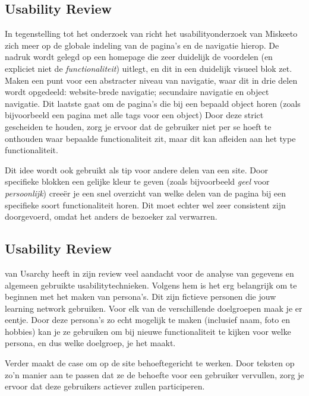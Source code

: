 \documentclass[a4paper, 10pt, pdftex]{report}
\begin{document}
    \subsection{Usability Review \citet{Hoekman2008}}
    In tegenstelling tot het onderzoek van \citeauthor{Alfrink2008} richt het usabilityonderzoek van Miskeeto zich meer op de globale indeling van de pagina's en de navigatie hierop. De nadruk wordt gelegd op een homepage die zeer duidelijk de voordelen (en expliciet niet de \emph{functionaliteit}) uitlegt, en dit in een duidelijk visueel blok zet. \citeauthor{Hoekman2008} Maken een punt voor een abstracter niveau van navigatie, waar dit in drie delen wordt opgedeeld: website-brede navigatie; secundaire navigatie en object navigatie. Dit laatste gaat om de pagina's die bij een bepaald object horen (zoals bijvoorbeeld een pagina met alle tags voor een object) Door deze strict gescheiden te houden, zorg je ervoor dat de gebruiker niet per se hoeft te onthouden waar bepaalde functionaliteit zit, maar dit kan afleiden aan het type functionaliteit.

    Dit idee wordt ook gebruikt als tip voor andere delen van een site. Door specifieke blokken een gelijke kleur te geven (zoals bijvoorbeeld \emph{geel} voor \emph{persoonlijk}) cree\"er je een snel overzicht van welke delen van de pagina bij een specifieke soort functionaliteit horen. Dit moet echter wel zeer consistent zijn doorgevoerd, omdat het anders de bezoeker zal verwarren.

    \subsection{Usability Review \citet{Timmerman2008}}
    \citeauthor{Timmerman2008} van Usarchy heeft in zijn review veel aandacht voor de analyse van gegevens en algemeen gebruikte usabilitytechnieken. Volgens hem is het erg belangrijk om te beginnen met het maken van persona's. Dit zijn fictieve personen die jouw learning network gebruiken. Voor elk van de verschillende doelgroepen maak je er eentje. Door deze persona's zo echt mogelijk te maken (inclusief naam, foto en hobbies) kan je ze gebruiken om bij nieuwe functionaliteit te kijken voor welke persona, en dus welke doelgroep, je het maakt.

    Verder maakt \citeauthor{Timmerman2008} de case om op de site behoeftegericht te werken. Door teksten op zo'n manier aan te passen dat ze de behoefte voor een gebruiker vervullen, zorg je ervoor dat deze gebruikers actiever zullen participeren.
\end{document}
